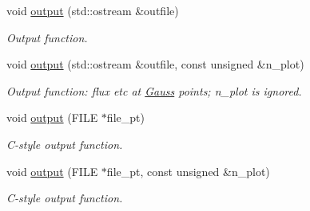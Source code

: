 \begin{DoxyCompactItemize}
void \hyperlink{classoomph_1_1PMLHelmholtzFluxFromNormalDisplacementBCElement_a64c0556634eed3070ae9a63d2a43efb5}{output} (std\+::ostream \&outfile)
\begin{DoxyCompactList}\small\item\em Output function. \end{DoxyCompactList}\item 
void \hyperlink{classoomph_1_1PMLHelmholtzFluxFromNormalDisplacementBCElement_af0317c3b22f661138ddc31968c67eed8}{output} (std\+::ostream \&outfile, const unsigned \&n\+\_\+plot)
\begin{DoxyCompactList}\small\item\em Output function\+: flux etc at \hyperlink{classoomph_1_1Gauss}{Gauss} points; n\+\_\+plot is ignored. \end{DoxyCompactList}\item 
void \hyperlink{classoomph_1_1PMLHelmholtzFluxFromNormalDisplacementBCElement_a357bf237c7b8a0d421851a6e8f93a9b6}{output} (F\+I\+LE $\ast$file\+\_\+pt)
\begin{DoxyCompactList}\small\item\em C-\/style output function. \end{DoxyCompactList}\item 
void \hyperlink{classoomph_1_1PMLHelmholtzFluxFromNormalDisplacementBCElement_a798feeb0c2f831476e3ded0a91c6a572}{output} (F\+I\+LE $\ast$file\+\_\+pt, const unsigned \&n\+\_\+plot)
\begin{DoxyCompactList}\small\item\em C-\/style output function. \end{DoxyCompactList}\end{DoxyCompactItemize}
